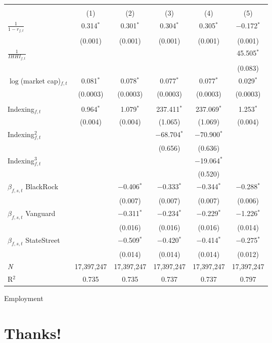 \documentclass[aspectratio=169]{beamer}
\begin{document}
\begin{frame}
\tiny
\begin{center}
\begin{tabular}{@{\extracolsep{5pt}}lccccc} 
\toprule
\\[-1.8ex] & (1) & (2) & (3) & (4) & (5)\\ 
\midrule
$\frac{1}{1-r_{f,t}}$& 0.314$^{*}$ & 0.301$^{*}$ & 0.304$^{*}$ & 0.305$^{*}$ & $-$0.172$^{*}$ \\ 
  & (0.001) & (0.001) & (0.001) & (0.001) & (0.001) \\ 
$\frac{1}{IHHI_{f,t}}$&  &  &  &  & 45.505$^{*}$ \\ 
  &  &  &  &  & (0.083) \\ 
$\log$(market cap)$_{f,t}$ & 0.081$^{*}$ & 0.078$^{*}$ & 0.077$^{*}$ & 0.077$^{*}$ & 0.029$^{*}$ \\ 
  & (0.0003) & (0.0003) & (0.0003) & (0.0003) & (0.0003) \\ 
  & & & & & \\ 
Indexing$_{f,t}$ & 0.964$^{*}$ & 1.079$^{*}$ &237.411$^{*}$  &237.069$^{*}$  & 1.253$^{*}$ \\ 
  & (0.004) & (0.004) & (1.065) & (1.069) & (0.004) \\ 
Indexing$_{f,t}^2$  &  &  & $-$68.704$^{*}$ &$-$70.900$^{*}$  &  \\ 
  &  &  & (0.656) &(0.636)  &  \\ 
Indexing$_{f,t}^3$ &  &  &  & $-$19.064$^{*}$ &  \\ 
  &  &  &  & (0.520) &  \\ 
$\beta_{f,s,t}$ BlackRock &  & $-$0.406$^{*}$ & $-$0.333$^{*}$ & $-$0.344$^{*}$ & $-$0.288$^{*}$ \\ 
  &  & (0.007) & (0.007) & (0.007) & (0.006) \\ 
$\beta_{f,s,t}$ Vanguard &  & $-$0.311$^{*}$ & $-$0.234$^{*}$ & $-$0.229$^{*}$ & $-$1.226$^{*}$ \\ 
  &  & (0.016) & (0.016) & (0.016) & (0.014) \\ 
$\beta_{f,s,t}$ StateStreet &  & $-$0.509$^{*}$ & $-$0.420$^{*}$ & $-$0.414$^{*}$ & $-$0.275$^{*}$ \\ 
  &  & (0.014) & (0.014) & (0.014) & (0.012) \\ 
  \midrule
 \textit{N} & 17,397,247 & 17,397,247 & 17,397,247 & 17,397,247 & 17,397,247 \\ 
R$^{2}$ & 0.735 & 0.735 & 0.737 & 0.737 & 0.797 \\ 
\bottomrule
\end{tabular} 
\end{center}
\end{frame}




\begin{frame}{Employment}
\begin{center}
\end{center}
\end{frame}







\section*{Thanks!}
\end{document}
